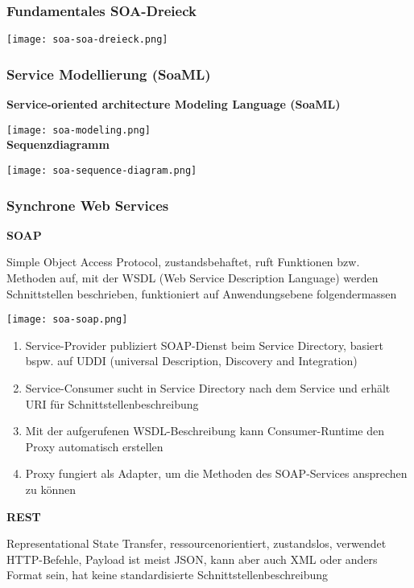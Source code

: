 \subsubsection{Fundamentales SOA-Dreieck}

\texttt{[image: soa-soa-dreieck.png]}

\subsubsection{Service Modellierung (SoaML)}

\textbf{Service-oriented architecture Modeling Language (SoaML)}

\texttt{[image: soa-modeling.png]} \\

\textbf{Sequenzdiagramm}

\texttt{[image: soa-sequence-diagram.png]}

\subsubsection{Synchrone Web Services}

\textbf{SOAP}

Simple Object Access Protocol, zustandsbehaftet, ruft Funktionen bzw. Methoden auf, mit der WSDL (Web Service Description Language) werden Schnittstellen beschrieben, funktioniert auf Anwendungsebene folgendermassen

\texttt{[image: soa-soap.png]}

\begin{enumerate}
    \item Service-Provider publiziert SOAP-Dienst beim Service Directory, basiert bspw. auf UDDI (universal Description, Discovery and Integration)
    \item Service-Consumer sucht in Service Directory nach dem Service und erhält URI für Schnittstellenbeschreibung
    \item Mit der aufgerufenen WSDL-Beschreibung kann Consumer-Runtime den Proxy automatisch erstellen
    \item Proxy fungiert als Adapter, um die Methoden des SOAP-Services ansprechen zu können
\end{enumerate}
\vspace{10pt}
\textbf{REST}

Representational State Transfer, ressourcenorientiert, zustandslos, verwendet HTTP-Befehle, Payload ist meist JSON, kann aber auch XML oder anders Format sein, hat keine standardisierte Schnittstellenbeschreibung


